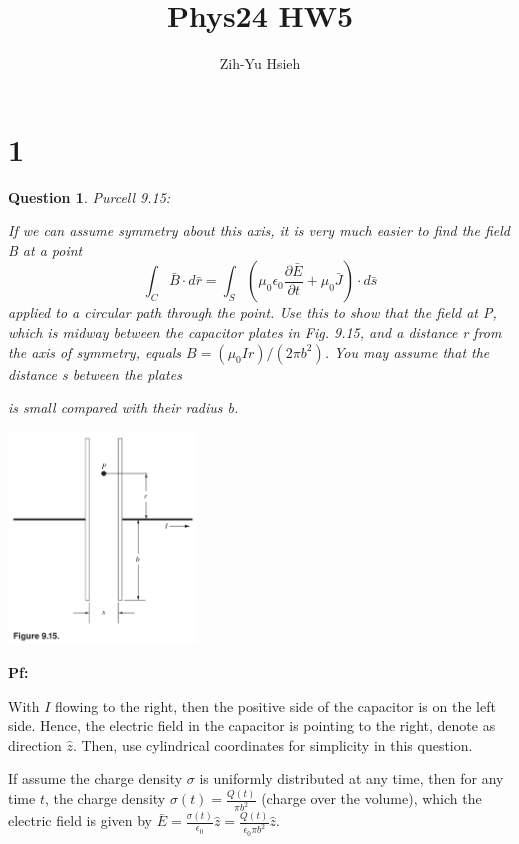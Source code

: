 \documentclass{article}
\title{Phys24 HW5}
\author{Zih-Yu Hsieh}
\newtheorem{question}{Question}
\begin{document}
\maketitle

\section*{1}
\begin{myBox}[]{}
    \begin{question}
        Purcell 9.15:

        If we can assume symmetry
        about this axis, it is very much easier to find the field B at a point
        $$\int_C\bar{B}\cdot d\bar{r} = \int_S\left(\mu_0\epsilon_0\frac{\partial \bar{E}}{\partial t}+\mu_0\bar{J}\right)\cdot d\bar{s}$$
        applied to a circular path through the point. Use this to show that
        the field at P, which is midway between the capacitor plates in
        Fig. 9.15, and a distance r from the axis of symmetry, equals $B=(\mu_0Ir)/(2\pi b^2)$. 
        You may assume that the distance s between the plates

        is small compared with their radius b.

        \begin{center}
            \includegraphics*[width=50mm]{phys 24 hw 5 p1.png}
        \end{center}
    \end{question}
\end{myBox}

\textbf{Pf:}

With $I$ flowing to the right, then the positive side of the capacitor is on the left side. Hence, the electric field in the capacitor is pointing to the right, denote as direction $\hat{z}$.
Then, use cylindrical coordinates for simplicity in this question.

If assume the charge density $\sigma$ is uniformly distributed at any time, then for any time $t$, the charge density $\sigma(t)=\frac{Q(t)}{\pi b^2}$ (charge over the volume),
which the electric field is given by $\bar{E}=\frac{\sigma(t)}{\epsilon_0}\hat{z} = \frac{Q(t)}{\epsilon_0\pi b^2}\hat{z}$.
\end{document}
